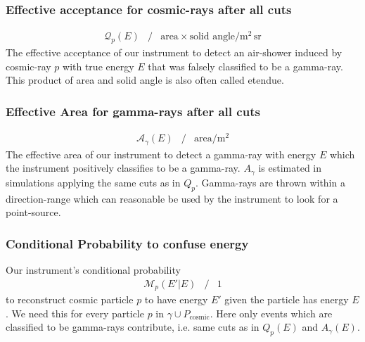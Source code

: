 \documentclass{article}%
\begin{document}
\subsubsection*{Effective acceptance for cosmic-rays after all cuts}
\begin{eqnarray*}
\mathcal{Q}_p(E) &/&
\text{area} \times{} \text{solid angle} /
\text{m}^{2}\,\text{sr}
\end{eqnarray*}
%
The effective acceptance of our instrument to detect an air-shower induced by cosmic-ray $p$ with true energy $E$ that was falsely classified to be a gamma-ray.
%
This product of area and solid angle is also often called etendue.
%
\subsubsection*{Effective Area for gamma-rays after all cuts}
\begin{eqnarray*}
\mathcal{A}_\gamma(E) &/&
\text{area} /
\text{m}^{2}
\end{eqnarray*}
%
The effective area of our instrument to detect a gamma-ray with energy $E$ which the instrument positively classifies to be a gamma-ray.
%
$A_\gamma$ is estimated in simulations applying the same cuts as in $Q_p$.
%
Gamma-rays are thrown within a direction-range which can reasonable be used by the instrument to look for a point-source.
%
\subsubsection*{Conditional Probability to confuse energy}
%
Our instrument's conditional probability
%
\begin{eqnarray*}
\mathcal{M}_p(E' \vert E) &/& 1
\end{eqnarray*}
%
to reconstruct cosmic particle $p$ to have energy $E'$ given the particle has energy $E$.
%
We need this for every particle $p$ in $\gamma \cup P_\text{cosmic}$.
%
Here only events which are classified to be gamma-rays contribute, i.e. same cuts as in $Q_p(E)$ and $A_\gamma(E)$.
%
\end{document}
